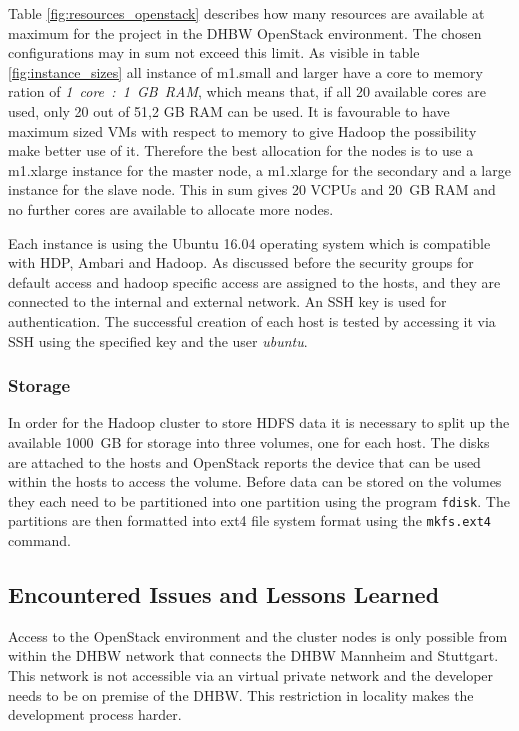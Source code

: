 Table \ref{fig:resources_openstack} describes how many resources are available at maximum for the project in the \ac{DHBW} OpenStack environment. The chosen configurations may in sum not exceed this limit.
As visible in table \ref{fig:instance_sizes} all instance of m1.small and larger have a core to memory ration of \emph{1~core~:~1~GB~RAM}, which means that, if all 20 available cores are used, only 20 out of 51,2 GB RAM  can be used. It is favourable to have maximum sized \acp{VM} with respect to memory to give Hadoop the possibility make better use of it.
Therefore the best allocation for the nodes is to use a m1.xlarge instance for the master node, a m1.xlarge for the secondary and a large instance for the slave node.
This in sum gives 20 \acp{VCPU} and 20~\ac{GB} \ac{RAM} and no further cores are available to allocate more nodes.


Each instance is using the Ubuntu 16.04 operating system which is compatible with \ac{HDP}, Ambari and Hadoop. As discussed before the security groups for default access and hadoop specific access are assigned to the hosts, and they are connected to the internal and external network. An \ac{SSH} key is used for authentication.
The successful creation of each host is tested by accessing it via \ac{SSH} using the specified key and the user \emph{ubuntu}.


\subsubsection{Storage}

In order for the Hadoop cluster to store \ac{HDFS} data it is necessary to split up the available 1000~\ac{GB} for storage into three volumes, one for each host.
The disks are attached to the hosts and OpenStack reports the device that can be 
used within the hosts to access the volume.
Before data can be stored on the volumes they each need to be partitioned into one partition using the program \texttt{fdisk}. The partitions are then formatted into ext4 file system format using the \texttt{mkfs.ext4} command.

\subsection{Encountered Issues and Lessons Learned}

Access to the OpenStack environment and the cluster nodes is only possible from within the \ac{DHBW} network that connects the \ac{DHBW} Mannheim and Stuttgart.
This network is not accessible via an virtual private network and the developer needs to be on premise of the \ac{DHBW}. This restriction in locality makes the development process harder.

